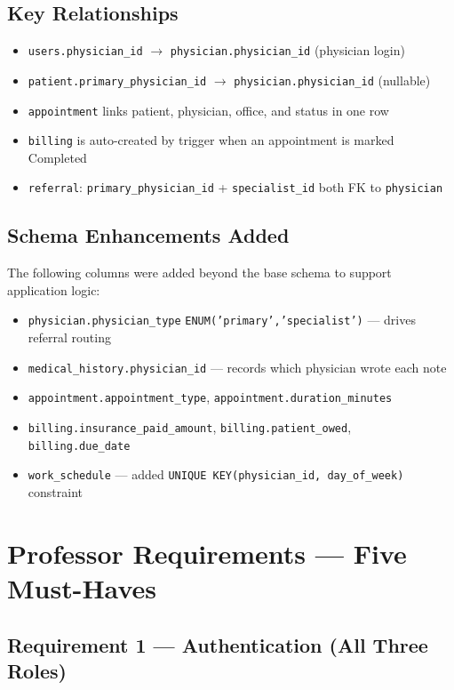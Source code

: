 \documentclass[12pt, letterpaper]{article}
\begin{document}
\subsection{Key Relationships}
\begin{itemize}
  \item \texttt{users.physician\_id} $\rightarrow$ \texttt{physician.physician\_id} (physician login)
  \item \texttt{patient.primary\_physician\_id} $\rightarrow$ \texttt{physician.physician\_id} (nullable)
  \item \texttt{appointment} links patient, physician, office, and status in one row
  \item \texttt{billing} is auto-created by trigger when an appointment is marked Completed
  \item \texttt{referral}: \texttt{primary\_physician\_id} + \texttt{specialist\_id} both FK to \texttt{physician}
\end{itemize}

\subsection{Schema Enhancements Added}
The following columns were added beyond the base schema to support application logic:

\begin{itemize}
  \item \texttt{physician.physician\_type} \texttt{ENUM('primary','specialist')} — drives referral routing
  \item \texttt{medical\_history.physician\_id} — records which physician wrote each note
  \item \texttt{appointment.appointment\_type}, \texttt{appointment.duration\_minutes}
  \item \texttt{billing.insurance\_paid\_amount}, \texttt{billing.patient\_owed}, \texttt{billing.due\_date}
  \item \texttt{work\_schedule} — added \texttt{UNIQUE KEY(physician\_id, day\_of\_week)} constraint
\end{itemize}

\section{Professor Requirements — Five Must-Haves}

\subsection{Requirement 1 — Authentication (All Three Roles)}
\end{document}
